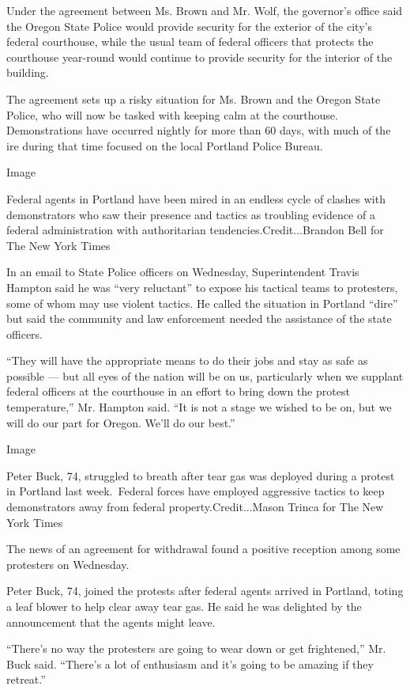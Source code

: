 Under the agreement between Ms. Brown and Mr. Wolf, the governor's
office said the Oregon State Police would provide security for the
exterior of the city's federal courthouse, while the usual team of
federal officers that protects the courthouse year-round would continue
to provide security for the interior of the building.

The agreement sets up a risky situation for Ms. Brown and the Oregon
State Police, who will now be tasked with keeping calm at the
courthouse. Demonstrations have occurred nightly for more than 60 days,
with much of the ire during that time focused on the local Portland
Police Bureau.

Image

Federal agents in Portland have been mired in an endless cycle of
clashes with demonstrators who saw their presence and tactics as
troubling evidence of a federal administration with authoritarian
tendencies.Credit...Brandon Bell for The New York Times

In an email to State Police officers on Wednesday, Superintendent Travis
Hampton said he was ``very reluctant'' to expose his tactical teams to
protesters, some of whom may use violent tactics. He called the
situation in Portland ``dire'' but said the community and law
enforcement needed the assistance of the state officers.

``They will have the appropriate means to do their jobs and stay as safe
as possible --- but all eyes of the nation will be on us, particularly
when we supplant federal officers at the courthouse in an effort to
bring down the protest temperature,'' Mr. Hampton said. ``It is not a
stage we wished to be on, but we will do our part for Oregon. We'll do
our best.''

Image

Peter Buck, 74, struggled to breath after tear gas was deployed during a
protest in Portland last week.~Federal forces have employed aggressive
tactics to keep demonstrators away from federal property.Credit...Mason
Trinca for The New York Times

The news of an agreement for withdrawal found a positive reception among
some protesters on Wednesday.

Peter Buck, 74, joined the protests after federal agents arrived in
Portland, toting a leaf blower to help clear away tear gas. He said he
was delighted by the announcement that the agents might leave.

``There's no way the protesters are going to wear down or get
frightened,'' Mr. Buck said. ``There's a lot of enthusiasm and it's
going to be amazing if they retreat.''

